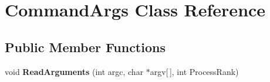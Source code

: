 \hypertarget{classCommandArgs}{}\section{Command\+Args Class Reference}
\label{classCommandArgs}
\subsection*{Public Member Functions}
\begin{DoxyCompactItemize}
\item 
\mbox{\label{classCommandArgs_a93f101d465df0ff6e79950c6b8ac4cd5}} 
void {\bfseries Read\+Arguments} (int argc, char $\ast$argv\mbox{[}$\,$\mbox{]}, int Process\+Rank)
\end{DoxyCompactItemize}
